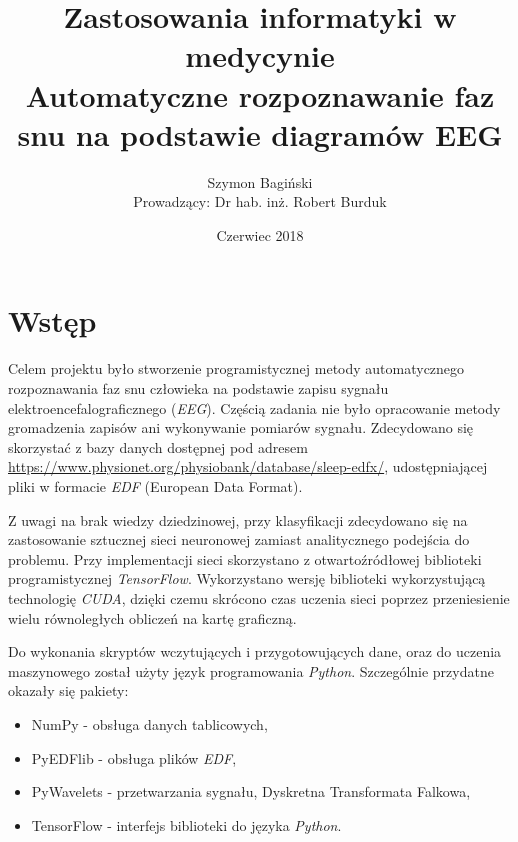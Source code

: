 \documentclass[12pt, notitlepage]{report}
\begin{document}
    \begin{titlepage}
        \thispagestyle{empty}
        \title{\Huge Zastosowania informatyki w medycynie \\[1cm]\Huge Automatyczne rozpoznawanie faz snu na podstawie diagramów EEG}
        \author{Szymon Bagiński \\[1cm]{\small Prowadzący: Dr hab. inż. Robert Burduk}}
        \date{Czerwiec 2018}
        \maketitle
        \vfill
        \renewcommand{\chapter}[2]{}
        \begin{center}
            \Large \bfseries\contentsname
        \end{center}
        \tableofcontents
        \vfill
    \end{titlepage}    

    \chapter*{Wstęp}
        Celem projektu było stworzenie programistycznej metody automatycznego rozpoznawania faz snu człowieka na podstawie zapisu sygnału elektroencefalograficznego (\textit{EEG}). Częścią zadania nie było opracowanie metody gromadzenia zapisów ani wykonywanie pomiarów sygnału. Zdecydowano się skorzystać z bazy danych dostępnej pod adresem \url{https://www.physionet.org/physiobank/database/sleep-edfx/}, udostępniającej pliki w formacie \textit{EDF} (European Data Format). 

        Z uwagi na brak wiedzy dziedzinowej, przy klasyfikacji zdecydowano się na zastosowanie sztucznej sieci neuronowej zamiast analitycznego podejścia do problemu. Przy implementacji sieci skorzystano z otwartoźródłowej biblioteki programistycznej \textit{TensorFlow}. Wykorzystano wersję biblioteki wykorzystującą technologię \textit{CUDA}, dzięki czemu skrócono czas uczenia sieci poprzez przeniesienie wielu równoległych obliczeń na kartę graficzną.

        Do wykonania skryptów wczytujących i przygotowujących dane, oraz do uczenia maszynowego został użyty język programowania \textit{Python}. Szczególnie przydatne okazały się pakiety:
        \begin{itemize}
            \item NumPy - obsługa danych tablicowych,
            \item PyEDFlib - obsługa plików \textit{EDF},
            \item PyWavelets - przetwarzania sygnału, Dyskretna Transformata Falkowa,
            \item TensorFlow - interfejs biblioteki do języka \textit{Python}.
        \end{itemize}
\end{document}

